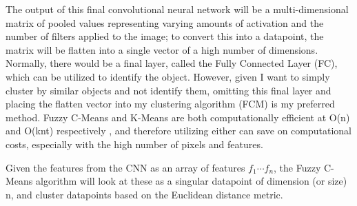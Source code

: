 \documentclass[10pt,twocolumn]{article}
\begin{document}
The output of this final convolutional neural network will be a multi-dimensional matrix of pooled values representing varying amounts of activation \cite{Arc2018} and the number of filters applied to the image; to convert this into a datapoint, the matrix will be flatten into a single vector of a high number of dimensions. Normally, there would be a final layer, called the Fully Connected Layer (FC), which can be utilized to identify the object. However, given I want to simply cluster by similar objects and not identify them, omitting this final layer and placing the flatten vector into my clustering algorithm (FCM) is my preferred method. Fuzzy C-Means and K-Means are both computationally efficient at O(n) and O(knt) respectively \cite{Mittal2021}, and therefore utilizing either can save on computational costs, especially with the high number of pixels and features. 

Given the features from the CNN as an array of features \(f_{1} \cdots f_{n}\), the Fuzzy C-Means algorithm will look at these as a singular datapoint of dimension (or size) n, and cluster datapoints based on the Euclidean distance metric. 



	
	
\end{document}
